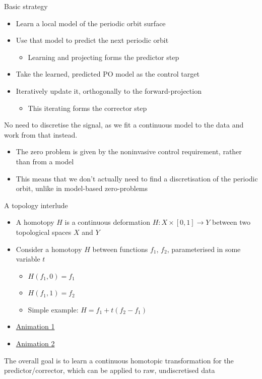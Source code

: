 \documentclass[presentation]{beamer}
\begin{document}
\begin{frame}[label={sec:org333e646}]{Basic strategy}
\begin{itemize}
\item Learn a local model of the periodic orbit surface
\item Use that model to predict the next periodic orbit
\begin{itemize}
\item Learning and projecting forms the predictor step
\end{itemize}
\item Take the learned, predicted PO model as the control target
\item Iteratively update it, orthogonally to the forward-projection 
\begin{itemize}
\item This iterating forms the corrector step
\end{itemize}
\end{itemize}

No need to discretise the signal, as we fit a continuous model to the data and work from that instead.

\begin{itemize}
\item The zero problem is given by the noninvasive control requirement, rather than from a model
\item This means that we don't actually need to find a discretisation of the periodic orbit, unlike in model-based zero-problems
\end{itemize}
\end{frame}

\begin{frame}[label={sec:org41cdae7}]{A topology interlude}
\begin{itemize}
\item A homotopy \(H\) is a continuous deformation \(H:X \times [0,1] \to Y\) between two topological spaces \(X\) and \(Y\)
\item Consider a homotopy \(H\) between functions \(f_1\), \(f_2\), parameterised in some variable \(t\)
\begin{itemize}
\item \(H(f_1, 0) = f_1\)
\item \(H(f_1, 1) = f_2\)
\item Simple example: \(H = f_1 + t(f_2 - f_1)\)
\end{itemize}
\item \href{https://upload.wikimedia.org/wikipedia/commons/7/7e/HomotopySmall.gif}{Animation 1}
\item \href{https://en.wikipedia.org/wiki/Homotopy\#/media/File:Mug\_and\_Torus\_morph.gif}{Animation 2}
\end{itemize}

The overall goal is to learn a continuous homotopic transformation for the predictor/corrector, which can be applied to raw, undiscretised data
\end{frame}
\end{document}
